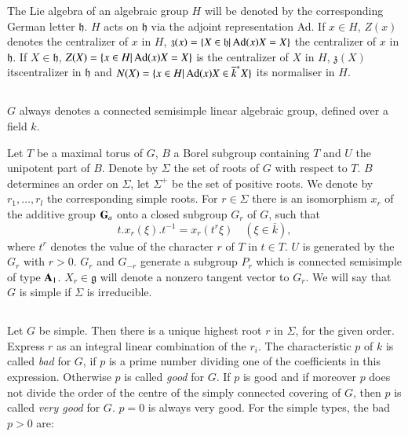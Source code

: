 The Lie algebra of an algebraic group $H$ will be denoted by the corresponding German letter $\mathfrak{h}$. $H$ acts on $\mathfrak{h}$ via the adjoint representation Ad. If $x\in H$, $Z(x)$ denotes the centralizer of $x$ in $H$, $\mathfrak{z}(x)=\{X\in \mathfrak{h}|\operatorname{\mathrm{Ad}} (x)X=X\}$ the centralizer of $x$ in $\mathfrak{h}$. If $X\in \mathfrak{h}$, $Z(X)=\{x\in H|\operatorname{\mathrm{Ad}} (x)X=X\}$ is the centralizer of $X$ in $H$, $\mathfrak{z}(X)$ its\pageoriginale centralizer in $\mathfrak{h}$ and $N(X)=\{x\in H|\operatorname{\mathrm{Ad}} (x)X\in \overline{k}^{*}X\}$ its normaliser in $H$.

\subsection{}\label{art19-sec0.2}
$G$ always denotes a connected semisimple linear algebraic group, defined over a field $k$.

Let $T$ be a maximal torus of $G$, $B$ a Borel subgroup containing $T$ and $U$ the unipotent part of $B$. Denote by $\Sigma$ the set of roots of $G$ with respect to $T$. $B$ determines an order on $\Sigma$, let $\Sigma^{+}$ be the set of positive roots. We denote by $r_{1},\ldots,r_{l}$ the corresponding simple roots. For $r\in \Sigma$ there is an isomorphism $x_{r}$ of the additive group $\mathbf{G}_{a}$ onto a closed subgroup $G_{r}$ of $G$, such that
$$
t.x_{r}(\xi).t^{-1}=x_{r}(t^{r}\xi)\quad (\xi\in \overline{k}),
$$
where $t^{r}$ denotes the value of the character $r$ of $T$ in $t\in T$. $U$ is generated by the $G_{r}$ with $r>0$. $G_{r}$ and $G_{-r}$ generate a subgroup $P_{r}$ which is connected semisimple of type $\mathbf{A}_{1}$. $X_{r}\in \mathfrak{g}$ will denote a nonzero tangent vector to $G_{r}$. We will say that $G$ is simple if $\Sigma$ is irreducible.

\subsection{}\label{art19-sec0.3}
Let $G$ be simple. Then there is a unique highest root $r$ in $\Sigma$, for the given order. Express $r$ as an integral linear combination of the $r_{i}$. The characteristic $p$ of $k$ is called {\em bad} for $G$, if $p$ is a prime number dividing one of the coefficients in this expression. Otherwise $p$ is called {\em good} for $G$. If $p$ is good and if moreover $p$ does not divide the order of the centre of the simply connected covering of $G$, then $p$ is called {\em very good} for $G$. $p=0$ is always very good. For the simple types, the bad $p>0$ are:

